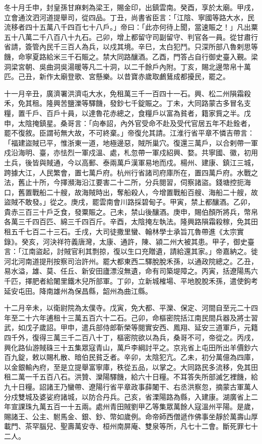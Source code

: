 \begin{pinyinscope}
 冬十月壬申，封皇孫甘麻剌為梁王，賜金印，出鎮雲南。癸酉，享於太廟。甲戌，立會通汶泗河道提舉司，從四品。丁丑，尚書省臣言：「江陰、寧國等路大水，民流移者四十五萬八千四百七十八戶。」帝曰：「此亦何待上聞，當速賑之！」凡出粟五十八萬二千八百八十九石。己卯，增上都留守司副留守、判官各一員。從甘肅行省請，簽管內民千三百人為兵，以戍其境。辛巳，太白犯鬥。只深所部八魯剌思等饑，命寧夏路給米三千石賑之。禁大同路釀酒。乙酉，門答占自行御史臺入覲。梁洞梁宮朝、吳曲洞吳湯暖等凡二十洞，以二千餘戶內附。丁亥，賜北邊幣帛十萬匹。己丑，新作太廟登歌、宮懸樂。以昔寶赤歲取鸕鶿成都擾民，罷之。



 十一月辛丑，廣濟署洪濟屯大水，免租萬三千一百四十一石。興、松二州隕霜殺禾，免其租。隆興苦鹽濼等驛饑，發鈔七千錠賑之。丁未，大同路蒙古多冒名支糧，置千戶、百戶十員，以達魯花赤總之，食糧戶以富為貧者，籍家貲之半。戊申，太陰掩鎮星。桑哥言：「向奉詔，內外官受命不赴及受代官居五年不赴銓者，罷不復敘。臣謂茍無大故，不可終棄。」帝復允其請。江淮行省平章不憐吉帶言：「福建盜賊已平，惟浙東一道，地極邊惡，賊所巢穴。復還三萬戶，以合剌帶一軍戍沿海明、臺，亦怯烈一軍戍溫、處，札忽帶一軍戍紹興、婺。共寧國、徽，初用土兵，後皆與賊通，今以高郵、泰兩萬戶漢軍易地而戍。楊州、建康、鎮江三城，跨據大江，人民繁會，置七萬戶府。杭州行省諸司府庫所在，置四萬戶府。水戰之法，舊止十所，今擇瀕海沿江要害二十二所，分兵閱習，伺察諸盜。錢塘控扼海口，舊置戰船二十艘，故海賊時出，奪船殺人，今增置戰船百艘、海船二十艘，故盜賊不敢發。」從之。庚戌，罷雲南會川路採碧甸子。甲寅，禁上都釀酒。乙卯，貴赤三百三十戶乏食，發粟賑之。己未，禁山後釀酒。庚申，賜伯顏所將兵，幣帛各萬三千四百匹、綿三千四百斤。辛酉，太陰掩左執法。隆興路隕霜殺稼，免其田租五千七百二十三石。壬戌，大司徒撒里蠻、翰林學士承旨兀魯帶進《太宗實錄》。癸亥，河決祥符義唐灣，太康、通許，陳、潁二州大被其患。甲子，御史臺言：「江南盜起，討賊官利其剽掠，復以生口充贈遺，請給還其家。」帝嘉納之。徙河北河南道提刑按察司治許州。罷大都東西二驛脫脫禾孫，以通政院總之。乙丑，易水溢，雄、莫、任丘、新安田廬漂沒無遺，命有司築堤障之。丙寅，括遼陽馬六千匹，擇肥者給闍里鐵木兒所部軍。丁卯，立新城榷場、平地脫脫禾孫，遣使鉤考延安屯田。降南雄州為保昌縣，韶州為曲江縣。



 十二月辛未，以衛尉院為太僕寺。戊寅，免大都、平灤、保定、河間自至元二十四年至二十六年逋租十三萬五百六十二石。己卯，命樞密院括江南民間兵器及將士習武，如戊子歲詔。甲申，遣兵部侍郎靳榮等閱實安西、鳳翔、延安三道軍戶，元籍四千外，復得三萬三千二百八十丁，樞密院欲以為兵，桑哥不可，帝從之。丙戌，興化路仙游賊硃三十五集眾寇青山，萬戶李綱討平之。京兆省上屯田所出羊價鈔六百九錠，敕以賜札散、暗伯民貧乏者。辛卯，太陰犯亢。乙未，初分萬億為四庫，以金銀輸內府，至是立提舉富寧庫，秩從五品，以掌之。大同路民多流移，免其田租二萬一千五百八石。洪贊、灤陽驛饑，給六十日糧。不耳答失所部滅乞裡饑，給九十日糧。詔諸王乃蠻帶、遼陽行省平章政事薛闍干、右丞洪察忽，摘蒙古軍萬人分戍雙城及婆娑府諸城，以防合丹兵。己亥，省溧陽路為縣，入建康。湖廣省上二年宣課珠九萬五百一十五兩。處州青田賊劉甲乙等集眾萬餘人寇溫州平陽。是歲，賜諸王、公主、駙馬金、銀、鈔、幣如歲例。命帝師西僧遞作佛事坐靜於萬壽山厚載門、茶罕腦兒、聖壽萬安寺、桓州南屏庵、雙泉等所，凡七十二會。斷死罪七十二人。




\end{pinyinscope}
